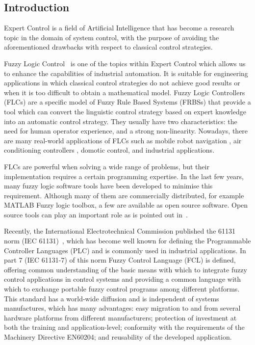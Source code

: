 \documentclass[11pt,twoside]{article}
\begin{document}
\vspace*{10pt}\textlineskip
\begin{multicols}{2}

\section{Introduction}

Expert Control is a field of Artificial Intelligence that has become a research topic in the domain of system control, with the purpose of avoiding the aforementioned drawbacks with respect to classical control strategies. 

Fuzzy Logic Control~\cite{Lee90,DHR93,Bon94} is one of the topics within Expert Control which allows us to enhance the capabilities of industrial automation. It is suitable for engineering applications in which classical control strategies do not achieve good results or when it is too difficult to obtain a mathematical model. Fuzzy Logic Controllers (FLCs) are a specific model of Fuzzy Rule Based Systems (FRBSs) that provide a tool which can convert the linguistic control strategy based on expert knowledge into an automatic control strategy. They usually have two characteristics: the need for human operator experience, and a strong non-linearity. Nowadays, there are many real-world applications of FLCs such as mobile robot navigation \cite{EH2010,JCh2011}, air conditioning controllers \cite{Alc09,Cho11}, domotic control\cite{Cha12,AL05}, and industrial applications\cite{Otero2008,Demir12,ZG2012}.

FLCs are powerful when solving a wide range of problems, but their implementation requires a certain programming expertise. In the last few years, many fuzzy logic software tools have been developed to minimise this requirement. Although many of them are commercially distributed, for example MATLAB Fuzzy logic toolbox, a few are available as open source software. Open source tools can play an important role as is pointed out in~\cite{Sonnenburg07}. 

Recently, the International Electrotechnical Commission published the 61131 norm (IEC 61131)~\cite{IEC}, which has become well known for defining the Programmable Controller Languages (PLC) and is commonly used in industrial applications. In part 7 (IEC 61131-7) of this norm Fuzzy Control Language (FCL) is defined, offering common understanding of the basic means with which to integrate fuzzy control applications in control systems and providing a common language with which to exchange portable fuzzy control programs among different platforms. This standard has a world-wide diffusion and is independent of systems manufactures, which has many advantages: easy migration to and from several hardware platforms from different manufacturers; protection of investment at both the training and application-level; conformity with the requirements of the Machinery Directive EN60204; and reusability of the developed application.


\end{multicols}
\end{document}
